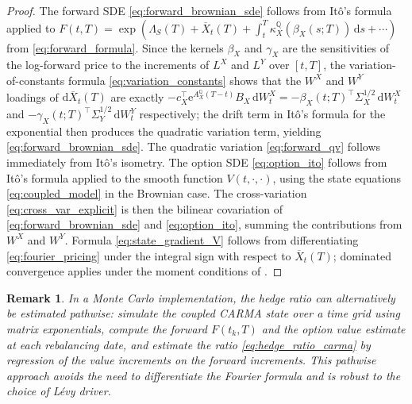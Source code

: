 \documentclass[10pt,a4paper,reqno]{amsart}
\newtheorem{remark}[theorem]{Remark}
\newcommand{\Q}{\mathbb{Q}}
\newcommand{\1}{\mathbbm{1}}
\newcommand{\dd}{\mathrm{d}}
\newcommand{\ee}{\mathrm{e}}
\begin{document}
\begin{proof}
The forward SDE \eqref{eq:forward_brownian_sde} follows from It\^o's formula
applied to $F(t,T) = \exp(\Lambda_S(T) + \overline{X}_t(T) + \int_t^T
\kappa_X^\Q(\beta_X(s;T))\,\dd s + \cdots)$ from \eqref{eq:forward_formula}.
Since the kernels $\beta_X$ and $\gamma_X$ are the sensitivities of the
log-forward price to the increments of $L^X$ and $L^Y$ over $[t,T]$, the
variation-of-constants formula \eqref{eq:variation_constants} shows that the
$W^X$ and $W^Y$ loadings of $\dd\overline{X}_t(T)$ are exactly
$-c_X^\top \ee^{A_X^\Q(T-t)}B_X\,\dd W_t^X
= -\beta_X(t;T)^\top\Sigma_X^{1/2}\,\dd W_t^X$ and
$-\gamma_X(t;T)^\top\Sigma_Y^{1/2}\,\dd W_t^Y$ respectively; the drift term
in It\^o's formula for the exponential then produces the quadratic variation
term, yielding \eqref{eq:forward_brownian_sde}.
The quadratic variation \eqref{eq:forward_qv} follows immediately from
It\^o's isometry.
The option SDE \eqref{eq:option_ito} follows from It\^o's formula applied to
the smooth function $V(t,\cdot,\cdot)$, using the state equations
\eqref{eq:coupled_model} in the Brownian case.
The cross-variation \eqref{eq:cross_var_explicit} is then the bilinear
covariation of \eqref{eq:forward_brownian_sde} and \eqref{eq:option_ito},
summing the contributions from $W^X$ and $W^Y$.
Formula \eqref{eq:state_gradient_V} follows from differentiating
\eqref{eq:fourier_pricing} under the integral sign with respect to
$\overline{X}_t(T)$; dominated convergence applies under the moment conditions
of .
\end{proof}

\begin{remark}
In a Monte Carlo implementation, the hedge ratio can alternatively be
estimated pathwise: simulate the coupled CARMA state over a time grid using
matrix exponentials, compute the forward $F(t_k,T)$ and the option value
estimate at each rebalancing date, and estimate the ratio
\eqref{eq:hedge_ratio_carma} by regression of the value increments on the
forward increments. This pathwise approach avoids the need to differentiate
the Fourier formula and is robust to the choice of Lévy driver.
\end{remark}
\end{document}
